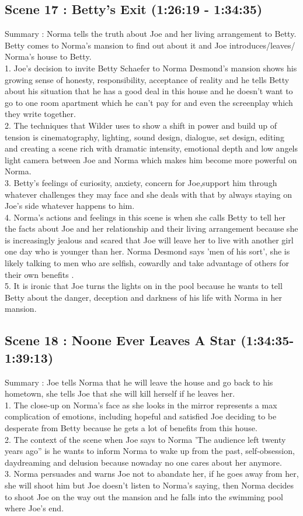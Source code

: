\documentclass[a4paper]{article}
\begin{document}
\subsection{Scene 17 : Betty’s Exit (1:26:19 - 1:34:35)}
Summary : Norma tells the truth about Joe and her living arrangement to Betty. Betty comes
to Norma’s mansion to find out about it and Joe introduces/leaves/ Norma’s house to Betty.\\
1. Joe's decision to invite Betty Schaefer to Norma Desmond's mansion shows his
growing sense of honesty, responsibility, acceptance of reality and he tells Betty
about his situation that he has a good deal in this house and he doesn’t want to go
to one room apartment which he can’t pay for and even the screenplay which they
write together.\\
2. The techniques that Wilder uses to show a shift in power and build up of tension is
cinematography, lighting, sound design, dialogue, set design, editing and creating a
scene rich with dramatic intensity, emotional depth and low angels light camera
between Joe and Norma which makes him become more powerful on Norma.\\
3. Betty's feelings of curiosity, anxiety, concern for Joe,support him through whatever
challenges they may face and she deals with that by always staying on Joe’s side
whatever happens to him.\\
4. Norma’s actions and feelings in this scene is when she calls Betty to tell her the facts
about Joe and her relationship and their living arrangement because she is
increasingly jealous and scared that Joe will leave her to live with another girl one
day who is younger than her. Norma Desmond says 'men of his sort', she is likely
talking to men who are selfish, cowardly and take advantage of others for their own
benefits .\\
5. It is ironic that Joe turns the lights on in the pool because he wants to tell Betty about
the danger, deception and darkness of his life with Norma in her mansion.

\subsection{Scene 18 : Noone Ever Leaves A Star (1:34:35-1:39:13)}
Summary : Joe tells Norma that he will leave the house and go back to his hometown, she
tells Joe that she will kill herself if he leaves her.\\
1. The close-up on Norma's face as she looks in the mirror represents a max
complication of emotions, including hopeful and satisfied Joe deciding to be
desperate from Betty because he gets a lot of benefits from this house.\\
2. The context of the scene when Joe says to Norma 'The audience left twenty years
ago” is he wants to inform Norma to wake up from the past, self-obsession,
daydreaming and delusion because nowaday no one cares about her anymore.\\
3. Norma persuades and warns Joe not to abandate her, if he goes away from her, she
will shoot him but Joe doesn’t listen to Norma’s saying, then Norma decides to shoot
Joe on the way out the mansion and he falls into the swimming pool where Joe’s
end.\\
\end{document}

